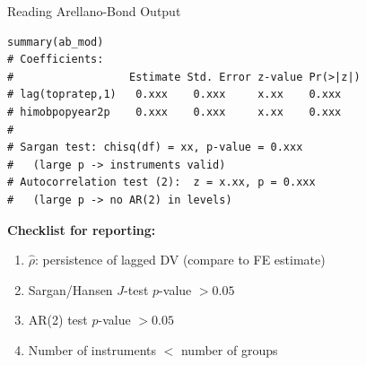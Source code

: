\documentclass[aspectratio=169, handout, t]{beamer}
\numberwithin{equation}{section}
\begin{document}
\begin{frame}[fragile]{Reading Arellano-Bond Output}
\begin{lstlisting}[basicstyle=\ttfamily\scriptsize]
summary(ab_mod)
# Coefficients:
#                  Estimate Std. Error z-value Pr(>|z|)
# lag(topratep,1)   0.xxx    0.xxx     x.xx    0.xxx
# himobpopyear2p    0.xxx    0.xxx     x.xx    0.xxx
#
# Sargan test: chisq(df) = xx, p-value = 0.xxx
#   (large p -> instruments valid)
# Autocorrelation test (2):  z = x.xx, p = 0.xxx
#   (large p -> no AR(2) in levels)
\end{lstlisting}
\smallskip
\textbf{Checklist for reporting:}
\begin{enumerate}\itemsep=1pt
\item $\hat{\rho}$: persistence of lagged DV (compare to FE estimate)
\item Sargan/Hansen $J$-test $p$-value $> 0.05$
\item AR(2) test $p$-value $> 0.05$
\item Number of instruments $<$ number of groups
\end{enumerate}
\end{frame}
\end{document}
